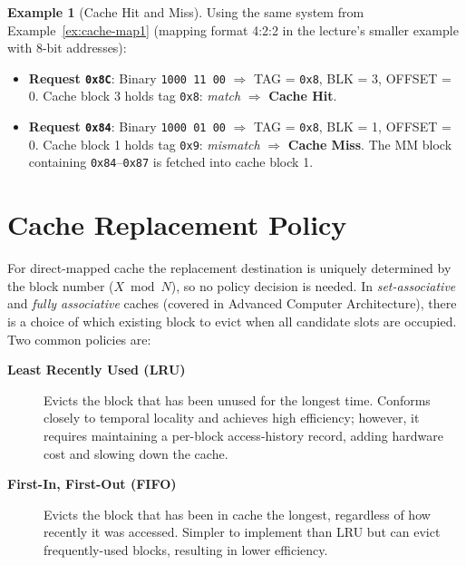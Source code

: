 \documentclass[11pt, a4paper, notitlepage]{report}
\theoremstyle{definition}
\theoremstyle{remark}
\theoremstyle{definition}
\newtheorem{example}[theorem]{Example}
\begin{document}
\begin{example}[Cache Hit and Miss]
  \label{ex:hit-miss}
  Using the same system from Example~\ref{ex:cache-map1} (mapping format 4:2:2 in the lecture's smaller example with 8-bit addresses):

  \begin{itemize}
    \item \textbf{Request \texttt{0x8C}}: Binary \texttt{1000 11 00} $\Rightarrow$ TAG = \texttt{0x8}, BLK = 3, OFFSET = 0. Cache block 3 holds tag \texttt{0x8}: \emph{match} $\Rightarrow$ \textbf{Cache Hit}.
    \item \textbf{Request \texttt{0x84}}: Binary \texttt{1000 01 00} $\Rightarrow$ TAG = \texttt{0x8}, BLK = 1, OFFSET = 0. Cache block 1 holds tag \texttt{0x9}: \emph{mismatch} $\Rightarrow$ \textbf{Cache Miss}. The MM block containing \texttt{0x84}--\texttt{0x87} is fetched into cache block 1.
  \end{itemize}
\end{example}

\section{Cache Replacement Policy}
\label{sec:cache-replacement}

For direct-mapped cache the replacement destination is uniquely determined by the block number ($X \bmod N$), so no policy decision is needed. In \emph{set-associative} and \emph{fully associative} caches (covered in Advanced Computer Architecture), there is a choice of which existing block to evict when all candidate slots are occupied. Two common policies are:

\begin{description}
  \item[\textbf{Least Recently Used (LRU)}] Evicts the block that has been unused for the longest time. Conforms closely to temporal locality and achieves high efficiency; however, it requires maintaining a per-block access-history record, adding hardware cost and slowing down the cache.
  \item[\textbf{First-In, First-Out (FIFO)}] Evicts the block that has been in cache the longest, regardless of how recently it was accessed. Simpler to implement than LRU but can evict frequently-used blocks, resulting in lower efficiency.
\end{description}
\end{document}
